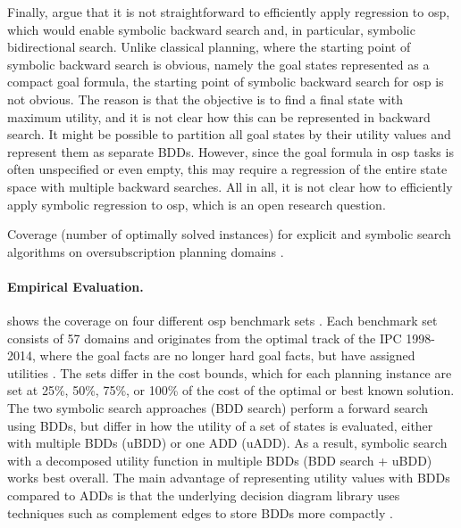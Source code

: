 Finally, \textcite{speck-katz-aaai2021} argue that it is not straightforward to efficiently apply regression to osp, which would enable symbolic backward search and, in particular, symbolic bidirectional search.
Unlike classical planning, where the starting point of symbolic backward search is obvious, namely the goal states represented as a compact goal formula, the starting point of symbolic backward search for osp is not obvious.
%
The reason is that the objective is to find a final state with maximum utility, and it is not clear how this can be represented in backward search.
It might be possible to partition all goal states by their utility values and represent them as separate BDDs.
However, since the goal formula in osp tasks is often unspecified or even empty, this may require a regression of the entire
state space with multiple backward searches.
All in all, it is not clear how to efficiently apply symbolic regression to osp, which is an open research question.

\begin{table}[t]
    \begin{center}
        \resizebox{1\textwidth}{!}{
            
        }
    \end{center}
    \caption[Coverage for oversubscription planning.]{Coverage (number of optimally solved instances) for explicit and symbolic search algorithms on oversubscription planning domains \autocite{speck-katz-aaai2021}.}
    \label{tab:coverage_oversubscription}
\end{table}

\paragraph{Empirical Evaluation.}
 shows the coverage on four different osp benchmark sets \autocite{speck-katz-aaai2021}.
Each benchmark set consists of 57 domains and originates from the optimal track of the IPC 1998-2014, where the goal facts are no longer hard goal facts, but have assigned utilities \autocite{katz-et-al-zenodo2019,katz-et-al-icaps2019}.
The sets differ in the cost bounds, which for each planning instance are set at 25\%, 50\%, 75\%, or 100\% of the cost of the optimal or best known solution.
The two symbolic search approaches (BDD search) perform a forward search using BDDs, but differ in how the utility of a set of states is evaluated, either with multiple BDDs (uBDD) or one ADD (uADD).
As a result, symbolic search with a decomposed utility function in multiple BDDs (BDD search + uBDD) works best overall.
The main advantage of representing utility values with BDDs compared to ADDs is that the underlying decision diagram library  \autocite{somenzi-cudd2015} uses techniques such as complement edges to store BDDs more compactly \autocite{brace-et-al-acm1990}.


